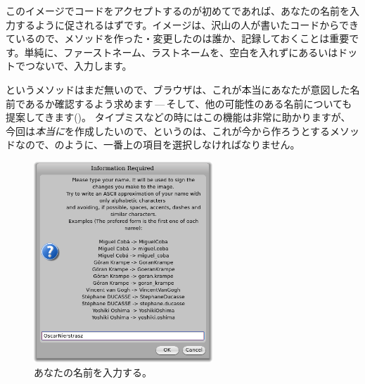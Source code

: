 \documentclass[a4paper,10pt,twoside]{book}
\begin{document}
このイメージでコードをアクセプトするのが初めてであれば、あなたの名前を入力するように促されるはずです。イメージは、沢山の人が書いたコードからできているので、メソッドを作った・変更したのは誰か、記録しておくことは重要です。単純に、ファーストネーム、ラストネームを、空白を入れずにあるいはドットでつないで、入力します。


というメソッドはまだ無いので、ブラウザは、これが本当にあなたが意図した名前であるか確認するよう求めます\,---\,そして、他の可能性のある名前についても提案してきます()。
タイプミスなどの時にはこの機能は非常に助かりますが、今回は\emph{本当に}を作成したいので、というのは、これが今から作ろうとするメソッドなので、のように、一番上の項目を選択しなければなりません。



\begin{figure}[htb]
\centerline {\includegraphics[width=0.6\textwidth]{name}}
\caption{あなたの名前を入力する。}
\end{figure}
\end{document}
